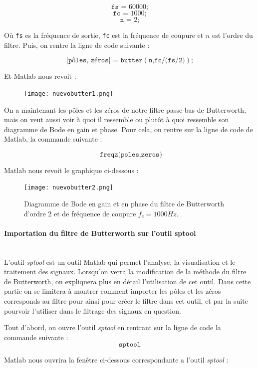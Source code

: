\documentclass[conference,onecolumn]{IEEEtran}
\begin{document}
\[\texttt{fs = }60000 \texttt{;}\]
\[\texttt{fc = }1000 \texttt{;}\]
\[\texttt{n = }2 \texttt{;}\]

Où \texttt{fs} es la fréquence de sortie, \texttt{fc} est la fréquence de coupure et $n$ est l’ordre du filtre. 
Puis, on rentre la ligne de code suivante :

\[\texttt{[pôles, zéros] = butter}(\texttt{n,fc/(fs/2)}) \texttt{;}\]

Et Matlab nous revoit :
\begin{figure}[H]
 \centering
    \texttt{[image: nuevobutter1.png]}
\end{figure}

On a maintenant les pôles et les zéros de notre filtre passe-bas de Butterworth, mais on veut aussi voir à quoi il ressemble ou plutôt à quoi ressemble son diagramme de Bode en gain et phase. Pour cela, on rentre sur la ligne de code de Matlab, la commande suivante :

\[\texttt{ freqz(poles,zeros)}\]


Matlab nous revoit le graphique ci-dessous :

\begin{figure}[H]
 \centering
    \texttt{[image: nuevobutter2.png]}
    \caption{Diagramme de Bode en gain et en phase du filtre de Butterworth d'ordre 2 et de fréquence de coupure $f_c = 1000 Hz$.}
\end{figure}

\paragraph{Importation du filtre de Butterworth sur l'outil sptool}
\hfill \\

L'outil \textit{sptool} est un outil Matlab qui permet l'analyse, la visualisation et le traitement des signaux. Lorsqu'on verra la modification de la méthode du filtre de Butterworth, on expliquera plus en détail l'utilisation de cet outil. Dans cette partie on se limitera à montrer comment importer les pôles et les zéros corresponds au filtre pour ainsi pour créer le filtre dans cet outil, et par la suite pourvoir l'utiliser dans le filtrage des signaux en question.

Tout d’abord, on ouvre l’outil \textit{sptool} en rentrant sur la ligne de code la commande suivante :
\[\texttt{sptool}\]

Matlab nous ouvrira la fenêtre ci-dessous correspondante a l’outil \textit{sptool} :
\end{document}
